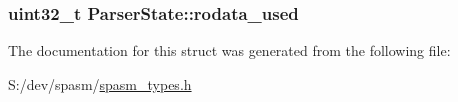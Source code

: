 \label{struct_parser_state_a5b8f112e7b118b93287c935dbe541224}
\hypertarget{struct_parser_state_a610de7682a50d494f840c335b66b88b7}{
\subsubsection[{rodata\-\_\-used}]{\setlength{\rightskip}{0pt plus 5cm}uint32\-\_\-t {\bf \-Parser\-State\-::rodata\-\_\-used}}}
\label{struct_parser_state_a610de7682a50d494f840c335b66b88b7}


\-The documentation for this struct was generated from the following file\-:\begin{DoxyCompactItemize}
\item 
\-S\-:/dev/spasm/\hyperlink{spasm__types_8h}{spasm\-\_\-types.\-h}\end{DoxyCompactItemize}
